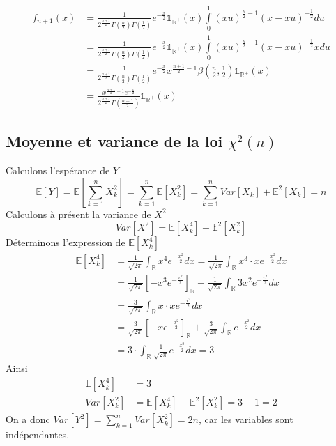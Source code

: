 \documentclass{report}
\begin{document}
			\begin{align*}
				f_{n+1}(x) &= \frac{1}{2^{\frac{n+1}{2}}\Gamma(\frac{n}{2})\Gamma(\frac{1}{2})}e^{-\frac{x}{2}}\mathds{1}_\mathbb{R^+}(x)\int\limits_0^1 (xu)^{\frac{n}{2}-1}(x-xu)^{-\frac{1}{2}}du\\
				&= \frac{1}{2^{\frac{n+1}{2}}\Gamma(\frac{n}{2})\Gamma(\frac{1}{2})}e^{-\frac{x}{2}}\mathds{1}_\mathbb{R^+}(x)\int\limits_0^1 (xu)^{\frac{n}{2}-1}(x-xu)^{-\frac{1}{2}}xdu\\
				&= \frac{1}{2^{\frac{n+1}{2}}\Gamma(\frac{n}{2})\Gamma(\frac{1}{2})}e^{-\frac{x}{2}}x^{\frac{n+1}{2}-1}\beta(\frac{n}{2}, \frac{1}{2})\mathds{1}_\mathbb{R^+}(x)\\
				&= \frac{x^{\frac{n+1}{2}-1}e^{-\frac{x}{2}}}{2^{\frac{n+1}{2}}\Gamma(\frac{n+1}{2})}\mathds{1}_\mathbb{R^+}(x)
			\end{align*}
		\subsection{Moyenne et variance de la loi $\chi^2(n)$}
			Calculons l'espérance de $Y$
			\[ \mathbb{E}[Y] = \mathbb{E}[\sum\limits_{k=1}^n X_k^2] = \sum\limits_{k=1}^n\mathbb{E}[X_k^2] = \sum\limits_{k=1}^n Var[X_k] + \mathbb{E}^2[X_k] = n \]
			Calculons à présent la variance de $X^2$
			\[ Var[X^2] = \mathbb{E}[X_k^4] - \mathbb{E}^2[X_k^2] \]
			Déterminons l'expression de $\mathbb{E}[X_k^4]$
			\begin{align*}
				\mathbb{E}[X_k^4] &= \frac{1}{\sqrt{2\pi}}\int_\mathbb{R} x^4 e^{-\frac{x^2}{2}}dx = \frac{1}{\sqrt{2\pi}}\int_\mathbb{R} x^3 \cdot xe^{-\frac{x^2}{2}}dx\\
				&= \frac{1}{\sqrt{2\pi}}[-x^3 e^{-\frac{x^2}{2}}]_\mathbb{R}+\frac{1}{\sqrt{2\pi}}\int_\mathbb{R} 3x^2e^{-\frac{x^2}{2}}dx\\
				&= \frac{3}{\sqrt{2\pi}}\int_\mathbb{R} x \cdot xe^{-\frac{x^2}{2}}dx\\
				&= \frac{3}{\sqrt{2\pi}}[-x e^{-\frac{x^2}{2}}]_\mathbb{R}+\frac{3}{\sqrt{2\pi}}\int_\mathbb{R} e^{-\frac{x^2}{2}}dx\\
				&= 3 \cdot \int_\mathbb{R} \frac{1}{\sqrt{2\pi}}e^{-\frac{x^2}{2}}dx = 3
			\end{align*}
			Ainsi
			\begin{align*}
				\mathbb{E}[X_k^4] &= 3\\
				Var[X_k^2] &= \mathbb{E}[X_k^4] - \mathbb{E}^2[X_k^2] = 3-1 = 2
			\end{align*}
			On a donc $Var[Y^2] = \sum\limits_{k=1}^n Var[X_k^2] = 2n$, car les variables sont indépendantes.
\end{document}
